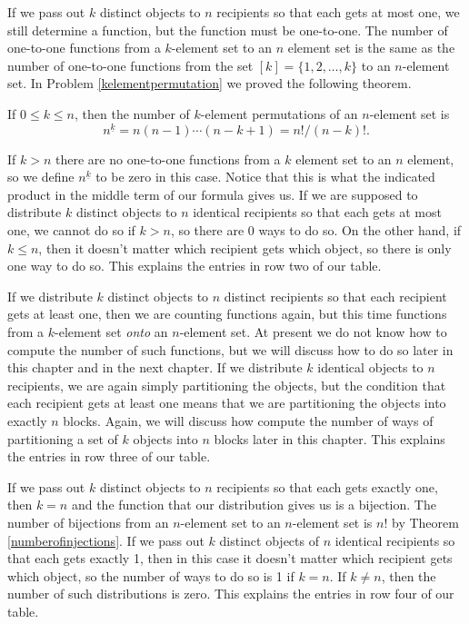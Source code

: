 If we pass out $k$ distinct objects to $n$ recipients so that each gets
at most one, we still determine a function, but the function must be
one-to-one.  The number of one-to-one functions from a $k$-element set to
an $n$ element set is the same as the number of one-to-one functions
from the set $[k] =\{1,2,\ldots,k\}$ to an $n$-element set.  In Problem
\ref{kelementpermutation} we proved the following theorem.
 \begin{theorem} If $0\le k\le n$, then the number of
$k$-element permutations of an $n$-element set is 
$$n^{\underline{k}} = n(n-1)\cdots(n-k+1) =
n!/(n-k)!.$$\label{numberofinjections}
 \end{theorem}
 If $k>n$ there are no one-to-one functions from a $k$ element set to an
$n$ element, so we define $n^{\underline{k}}$ to be zero in this case. 
Notice that this is what the indicated product in the middle term of our
formula gives us. If we are supposed to distribute
$k$ distinct objects to
$n$ identical recipients so that each gets at most one, we cannot do so
if $k>n$, so there are 0 ways to do so.  On the other hand, if $k\le n$,
then it doesn't matter which recipient gets which object, so there is
only one way to do so.  This explains the entries in row two of our table.

If we distribute $k$ distinct objects to $n$ distinct recipients so that
each recipient gets at least one, then we are counting functions again,
but this time functions from a $k$-element set {\em onto} an $n$-element
set.  At present we do not know how to compute the number of such
functions, but we will discuss how to do so later in this chapter and in
the next chapter.  If we distribute $k$ identical objects to $n$
recipients, we are again simply partitioning the objects, but the
condition that each recipient gets at least one means that we are
partitioning the objects into exactly $n$ blocks.  Again, we will discuss
how compute the number of ways of partitioning a set of $k$ objects into
$n$ blocks later in this chapter.  This explains the entries in row three
of our table.

If we pass out $k$ distinct objects to $n$ recipients so that each gets
exactly one, then $k=n$ and the function that our distribution gives us
is a bijection.  The number of bijections from an $n$-element set to an
$n$-element set is $n!$ by Theorem \ref{numberofinjections}.  If we pass
out $k$ distinct objects of $n$ identical recipients so that each gets
exactly 1, then in this case it doesn't matter which recipient gets which
object, so the number of ways to do so is 1 if $k=n$.  If $k\not=n$, then
the number of such distributions is zero.  This explains the entries in
row four of our table.

